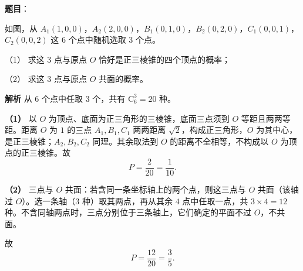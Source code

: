 \begin{answer}

\textbf{题目}：

如图，从 $A_1(1,0,0)$，$A_2(2,0,0)$，$B_1(0,1,0)$，$B_2(0,2,0)$，$C_1(0,0,1)$，$C_2(0,0,2)$ 这 $6$ 个点中随机选取 $3$ 个点。

（1） 求这 $3$ 点与原点 $O$ 恰好是正三棱锥的四个顶点的概率；

（2） 求这 $3$ 点与原点 $O$ 共面的概率。
\nopagebreak[4]
\begin{center}\end{center}
\nopagebreak[4]
\textbf{解析}
从 $6$ 个点中任取 $3$ 个，共有 $\mathrm C_6^3=20$ 种。

\textbf{（1）} 以 $O$ 为顶点、底面为正三角形的三棱锥，底面三点须到 $O$ 等距且两两等距。距离 $O$ 为 $1$ 的三点 $A_1,B_1,C_1$ 两两距离 $\sqrt2$，构成正三角形，$O$ 为其中心，是正三棱锥；$A_2,B_2,C_2$ 同理。其余取法到 $O$ 的距离不全相等，不构成以 $O$ 为顶点的正三棱锥。故
\nopagebreak[4]
\[P=\frac2{20}=\frac1{10}.\]

\textbf{（2）} 三点与 $O$ 共面：若含同一条坐标轴上的两个点，则这三点与 $O$ 共面（该轴过 $O$）。选一条轴（$3$ 种）取其两点，再从其余 $4$ 点中任取一点，共 $3\times4=12$ 种。不含同轴两点时，三点分别位于三条轴上，它们确定的平面不过 $O$，不共面。

故
\nopagebreak[4]
\[P=\frac{12}{20}=\frac35.\]



\end{answer}

